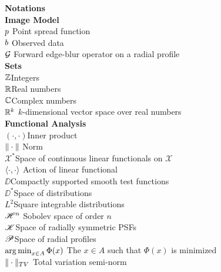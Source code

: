 {\bf {\Large Notations}} \\

{\bf {\large Image Model}}\\
$p \dotfill$ Point spread function\\
$b \dotfill$ Observed data\\
$\G \dotfill$ Forward edge-blur operator on a radial profile\\
%
{\bf {\large Sets}}\\
$\mathbb Z$\dotfill Integers\\
$\mathbb R$\dotfill Real numbers\\
$\mathbb C$\dotfill Complex numbers\\
$\mathbb R^k$  \dotfill $k$-dimensional vector space over real numbers\\
%
{\bf {\large Functional Analysis}}\\
$(\cdot,\cdot)$\dotfill Inner product\\
$\|\cdot \| \dotfill$ Norm\\
$\mathscr X^*$\dotfill Space of continuous linear functionals on $\mathscr X$\\
$\langle \cdot,\cdot \rangle \dotfill$ Action of linear functional\\
$\DD$\dotfill Compactly supported smooth test functions\\
$\DD^*$\dotfill Space of distributions\\
$L^2$\dotfill Square integrable distributions\\
$\HH^n \dotfill$ Sobolev space of order $n$\\
$\mathscr K$\dotfill Space of radially symmetric PSFs\\
$\mathscr P$\dotfill Space of radial profiles\\
$\argmin_{x\in A} \Phi(x) \dotfill$ The $x\in A$ such that $\Phi(x)$ is minimized\\
$\|\cdot \|_{TV} \dotfill$ Total variation semi-norm\\
%
